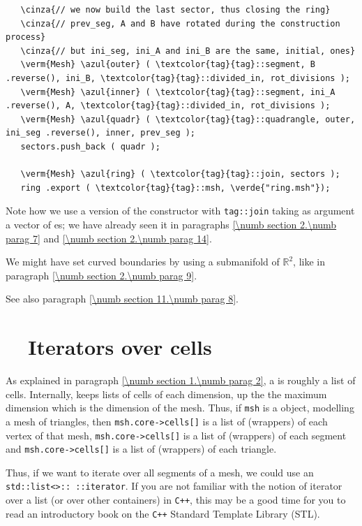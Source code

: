 \begin{Verbatim}
   \cinza{// we now build the last sector, thus closing the ring}
   \cinza{// prev_seg, A and B have rotated during the construction process}
   \cinza{// but ini_seg, ini_A and ini_B are the same, initial, ones}
   \verm{Mesh} \azul{outer} ( \textcolor{tag}{tag}::segment, B .reverse(), ini_B, \textcolor{tag}{tag}::divided_in, rot_divisions );
   \verm{Mesh} \azul{inner} ( \textcolor{tag}{tag}::segment, ini_A .reverse(), A, \textcolor{tag}{tag}::divided_in, rot_divisions );
   \verm{Mesh} \azul{quadr} ( \textcolor{tag}{tag}::quadrangle, outer, ini_seg .reverse(), inner, prev_seg );
   sectors.push_back ( quadr );
   
   \verm{Mesh} \azul{ring} ( \textcolor{tag}{tag}::join, sectors );
   ring .export ( \textcolor{tag}{tag}::msh, \verde{"ring.msh"});
\end{Verbatim}

Note how we use a version of the {\small\tt {}} constructor with {\small\tt \textcolor{tag}{tag}::join}
taking as argument a vector of {\small\tt {}}es; we have already seen it in paragraphs
\ref{\numb section 2.\numb parag 7} and \ref{\numb section 2.\numb parag 14}.

We might have set curved boundaries by using a submanifold of $ \mathbb{R}^2 $, like in paragraph
\ref{\numb section 2.\numb parag 9}.

See also paragraph \ref{\numb section 11.\numb parag 8}.


\section{~~Iterators over cells}\label{\numb section 9.\numb parag 3}

As explained in paragraph \ref{\numb section 1.\numb parag 2}, a {\small\tt {}} is
roughly a list of cells.
Internally, {\maniFEM} keeps lists of cells of each dimension, up the the maximum
dimension which is the dimension of the mesh.
Thus, if {\small\tt msh} is a {\small\tt {}} object, modelling a
mesh of triangles, then {\small\tt msh.core->cells[]} is a list of (wrappers) of
each vertex of that mesh, {\small\tt msh.core->cells[]} is a list of (wrappers) of
each segment and {\small\tt msh.core->cells[]} is a list of (wrappers) of each triangle.

Thus, if we want to iterate over all segments of a mesh, we could use an
{\small\tt std::list<>:: ::iterator}.
If you are not familiar with the notion of iterator over a list (or over other containers)
in {\tt C++}, this may be a good time for you to read an introductory book on the
{\tt C++} Standard Template Library (STL).

